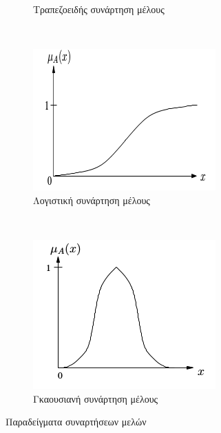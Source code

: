 \documentclass{assignment}
\begin{document}
\begin{figure}[htbp]
\begin{subfigure}[b]{0.5\textwidth}
  \caption{Τραπεζοειδής συνάρτηση μέλους}
  \end{subfigure}
   ~ %
  \begin{subfigure}[b]{0.4\textwidth}
    \includegraphics[width=\textwidth,height=0.25\textheight]{images/fuzzy_logic_membership_function_logistic.png}
  \caption{Λογιστική συνάρτηση μέλους}
  \end{subfigure}
   ~ %
  \begin{subfigure}[b]{0.5\textwidth}
    \includegraphics[width=\textwidth,height=0.25\textheight]{images/fuzzy_logic_membership_function_gaussian.png}
  \caption{Γκαουσιανή συνάρτηση μέλους}
  \end{subfigure}
  \caption{Παραδείγματα συναρτήσεων μελών \cite{engelbrecht}}
\label{fig:fuzzy_logic_membership_function}
\end{figure}
\end{document}
